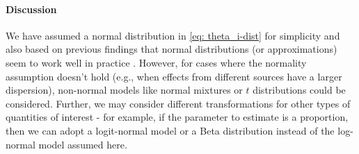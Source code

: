 \documentclass{article}
\begin{document}
\paragraph{Discussion}
We have assumed a normal distribution in \eqref{eq: theta_i-dist} for simplicity and
also based on previous findings that normal distributions (or approximations) seem to work well in practice \citep{schuemie2018empirical,mulgrave2020bayesian}.
However, for cases where the normality assumption doesn't hold (e.g., when effects from different sources have a larger dispersion),
non-normal models like normal mixtures or $t$ distributions could be considered.
Further, we may consider different transformations for other types of quantities of interest -
for example, if the parameter to estimate is a proportion, then we can adopt a logit-normal model or a Beta distribution instead of the log-normal model assumed here.

\newpage


\end{document}
